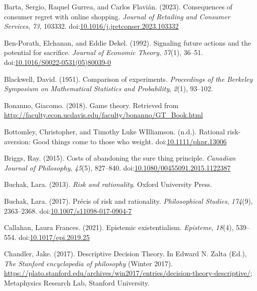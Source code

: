 \documentclass[
  12pt,
  letterpaper,
  DIV=11,
  numbers=noendperiod]{scrreprt}
\newlength{\cslhangindent}
\newenvironment{CSLReferences}[2] %
 {\begin{list}{}{%
  \setlength{\itemindent}{0pt}
  \setlength{\leftmargin}{0pt}
  \setlength{\parsep}{0pt}
  \ifodd #1
   \setlength{\leftmargin}{\cslhangindent}
   \setlength{\itemindent}{-1\cslhangindent}
  \fi
  \setlength{\itemsep}{#2\baselineskip}}}
 {\end{list}}
\begin{document}
\begin{CSLReferences}{1}{0}
Barta, Sergio, Raquel Gurrea, and Carlos Flavián. (2023). Consequences
of consumer regret with online shopping. \emph{Journal of Retailing and
Consumer Services}, \emph{73}, 103332.
doi:\href{https://doi.org/10.1016/j.jretconser.2023.103332}{10.1016/j.jretconser.2023.103332}

Ben-Porath, Elchanan, and Eddie Dekel. (1992). Signaling future actions
and the potential for sacrifice. \emph{Journal of Economic Theory},
\emph{57}(1), 36--51.
doi:\href{https://doi.org/10.1016/S0022-0531(05)80039-0}{10.1016/S0022-0531(05)80039-0}

Blackwell, David. (1951). Comparison of experiments. \emph{Proceedings
of the Berkeley Symposium on Mathematical Statistics and Probability},
\emph{2}(1), 93--102.

Bonanno, Giacomo. (2018). Game theory. Retrieved from
\url{http://faculty.econ.ucdavis.edu/faculty/bonanno/GT_Book.html}

Bottomley, Christopher, and Timothy Luke WIlliamson. (n.d.). Rational
risk-aversion: Good things come to those who weight.
doi:\href{https://doi.org/10.1111/phpr.13006}{10.1111/phpr.13006}

Briggs, Ray. (2015). Costs of abandoning the sure thing principle.
\emph{Canadian Journal of Philosophy}, \emph{45}(5), 827--840.
doi:\href{https://doi.org/10.1080/00455091.2015.1122387}{10.1080/00455091.2015.1122387}

Buchak, Lara. (2013). \emph{Risk and rationality}. Oxford University
Press.

Buchak, Lara. (2017). Pr{é}cis of risk and rationality.
\emph{Philosophical Studies}, \emph{174}(9), 2363--2368.
doi:\href{https://doi.org/10.1007/s11098-017-0904-7}{10.1007/s11098-017-0904-7}

Callahan, Laura Frances. (2021). Epistemic existentialism.
\emph{Episteme}, \emph{18}(4), 539--554.
doi:\href{https://doi.org/10.1017/epi.2019.25}{10.1017/epi.2019.25}

Chandler, Jake. (2017). {Descriptive Decision Theory}. In Edward N.
Zalta (Ed.), \emph{The {Stanford} encyclopedia of philosophy} ({W}inter
2017).
\url{https://plato.stanford.edu/archives/win2017/entries/decision-theory-descriptive/};
Metaphysics Research Lab, Stanford University.


\end{CSLReferences}
\end{document}
